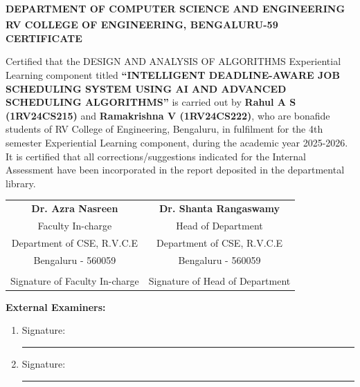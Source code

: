 \documentclass[12pt,a4paper]{article}
\begin{document}
\newpage

\thispagestyle{empty}
\begin{center}
    \large
    \textbf{DEPARTMENT OF COMPUTER SCIENCE AND ENGINEERING}\\
    \textbf{RV COLLEGE OF ENGINEERING\textsuperscript{\textregistered}, BENGALURU-59}\\
    \vspace{0.8cm}
    \Large
    \textbf{CERTIFICATE}\\
    \vspace{1cm}
\end{center}
\noindent
Certified that the DESIGN AND ANALYSIS OF ALGORITHMS Experiential Learning component titled \textbf{``INTELLIGENT DEADLINE-AWARE JOB SCHEDULING SYSTEM USING AI AND ADVANCED SCHEDULING ALGORITHMS''} is carried out by \textbf{Rahul A S (1RV24CS215)} and \textbf{Ramakrishna V (1RV24CS222)}, who are bonafide students of RV College of Engineering, Bengaluru, in fulfilment for the 4th semester Experiential Learning component, during the academic year 2025-2026. It is certified that all corrections/suggestions indicated for the Internal Assessment have been incorporated in the report deposited in the departmental library.

\vspace{2.5cm}
\noindent
\begin{tabular}{cc}
    \textbf{Dr. Azra Nasreen} & \textbf{Dr. Shanta Rangaswamy} \\
    Faculty In-charge & Head of Department \\
    Department of CSE, R.V.C.E & Department of CSE, R.V.C.E \\
    Bengaluru - 560059 & Bengaluru - 560059 \\
    & \\
    Signature of Faculty In-charge & Signature of Head of Department
\end{tabular}

\vspace{2.5cm}
\noindent
\textbf{External Examiners:}
\vspace{0.5cm}
\begin{enumerate}
    \item Signature: \rule{5cm}{0.4pt}
    \item Signature: \rule{5cm}{0.4pt}
\end{enumerate}
\end{document}
